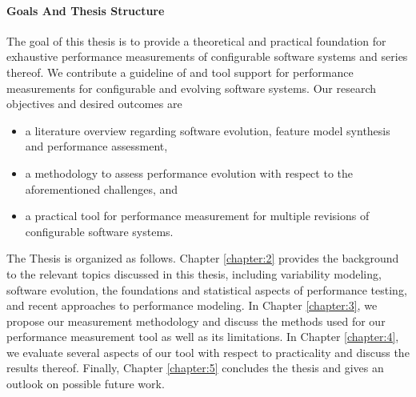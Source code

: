 \paragraph{Goals And Thesis Structure}

The goal of this thesis is to provide a theoretical and practical foundation for
exhaustive performance measurements of configurable software systems and series
thereof. We contribute a guideline of and tool support for performance
measurements for configurable and evolving software systems. Our research
objectives and desired outcomes are

\begin{itemize}
\item a literature overview regarding software evolution, feature model
synthesis and performance assessment,
\item a methodology to assess performance evolution with respect to the
aforementioned challenges, and
\item a practical tool for performance measurement for multiple revisions of
configurable software systems.
\end{itemize}

The Thesis is organized as follows. Chapter \ref{chapter:2} provides the
background to the relevant topics discussed in this thesis, including
variability modeling, software evolution, the foundations and statistical
aspects of performance testing, and recent approaches to performance modeling. In
Chapter \ref{chapter:3}, we propose our measurement methodology and discuss
the methods used for our performance measurement tool as well as its
limitations. In Chapter \ref{chapter:4}, we evaluate several aspects of our
tool with respect to practicality and discuss the results thereof. Finally,
Chapter \ref{chapter:5} concludes the thesis and gives an outlook on possible
future work.
